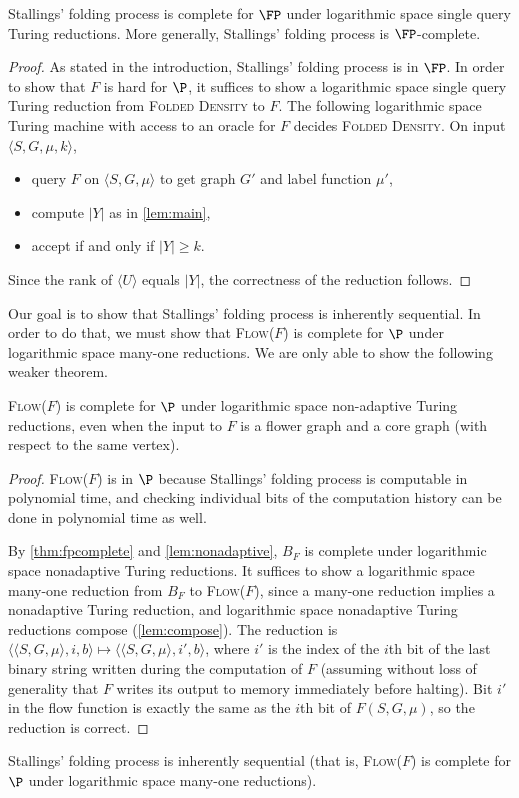 \documentclass{article}
\newcommand{\FD}{\textsc{Folded Density}}
\newcommand{\Flow}{\textsc{Flow($F$)}}
\newcommand{\gen}[1]{\langle #1 \rangle}
\begin{document}
\begin{theorem}\label{thm:fpcomplete}
  Stallings' folding process is complete for $\FP$ under logarithmic space single query Turing reductions.
  More generally, Stallings' folding process is $\FP$-complete.
\end{theorem}
\begin{proof}
  As stated in the introduction, Stallings' folding process is in $\FP$.
  In order to show that $F$ is hard for $\P$, it suffices to show a logarithmic space single query Turing reduction from \FD{} to $F$.
  The following logarithmic space Turing machine with access to an oracle for $F$ decides \FD{}.
  On input $\langle S, G, \mu, k \rangle$,
  \begin{itemize}
  \item query $F$ on $\langle S, G, \mu \rangle$ to get graph $G'$ and label function $\mu'$,
  \item compute $|Y|$ as in \autoref{lem:main},
  \item accept if and only if $|Y| \geq k$.
  \end{itemize}
  Since the rank of $\gen{U}$ equals $|Y|$, the correctness of the reduction follows.
\end{proof}

Our goal is to show that Stallings' folding process is inherently sequential.
In order to do that, we must show that \Flow{} is complete for $\P$ under logarithmic space many-one reductions.
We are only able to show the following weaker theorem.

\begin{theorem}
  \Flow{} is complete for $\P$ under logarithmic space non-adaptive Turing reductions, even when the input to $F$ is a flower graph and a core graph (with respect to the same vertex).
\end{theorem}
\begin{proof}
  \Flow{} is in $\P$ because Stallings' folding process is computable in polynomial time, and checking individual bits of the computation history can be done in polynomial time as well.

  By \autoref{thm:fpcomplete} and \autoref{lem:nonadaptive}, $B_F$ is complete under logarithmic space nonadaptive Turing reductions.
  It suffices to show a logarithmic space many-one reduction from $B_F$ to \Flow{}, since a many-one reduction implies a nonadaptive Turing reduction, and logarithmic space nonadaptive Turing reductions compose (\autoref{lem:compose}).
  The reduction is $\langle \langle S, G, \mu \rangle, i, b \rangle \mapsto \langle \langle S, G, \mu \rangle, i', b\rangle$, where $i'$ is the index of the $i$th bit of the last binary string written during the computation of $F$ (assuming without loss of generality that $F$ writes its output to memory immediately before halting).
  Bit $i'$ in the flow function is exactly the same as the $i$th bit of $F(S, G, \mu)$, so the reduction is correct.
\end{proof}

\begin{conjecture}
  Stallings' folding process is inherently sequential (that is, \Flow{} is complete for $\P$ under logarithmic space many-one reductions).
\end{conjecture}

\printbibliography
\end{document}
